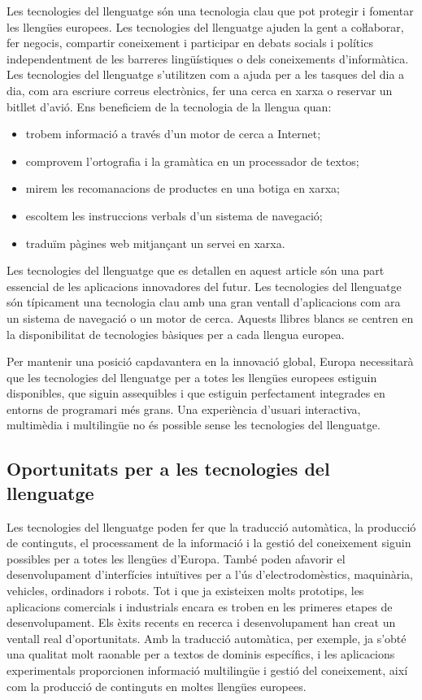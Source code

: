 \begin{multicols}{2}
Les tecnologies del llenguatge són una tecnologia clau que pot protegir i fomentar les llengües europees. Les tecnologies del llenguatge ajuden la gent a coŀlaborar, fer negocis, compartir coneixement i participar en debats socials i polítics independentment de les barreres lingüístiques o dels coneixements d’informàtica. Les tecnologies del llenguatge s’utilitzen com a ajuda per a les tasques del dia a dia, com ara escriure correus electrònics, fer una cerca en xarxa o reservar un bitllet d’avió. Ens beneficiem de la tecnologia de la llengua quan:   
\begin{itemize}
\item trobem informació a través d’un motor de cerca a Internet;
\item comprovem l’ortografia i la gramàtica en un processador de textos;
\item mirem les recomanacions de productes en una botiga en xarxa;
\item escoltem les instruccions verbals d'un sistema de navegació;
\item traduïm pàgines web mitjançant un servei en xarxa.
\end{itemize}

Les tecnologies del llenguatge que es detallen en aquest article són una part essencial de les aplicacions innovadores del futur. Les tecnologies del llenguatge són típicament una tecnologia clau amb una gran ventall d’aplicacions com ara un sistema de navegació o un motor de cerca. Aquests llibres blancs se centren en la disponibilitat de tecnologies bàsiques per a cada llengua europea.

Per mantenir una posició capdavantera en la innovació global, Europa necessitarà que les tecnologies del llenguatge per a totes les llengües europees estiguin disponibles, que siguin assequibles i que estiguin perfectament integrades en entorns de programari més grans.  Una experiència d’usuari interactiva, multimèdia i multilingüe no és possible sense les tecnologies del llenguatge.

\subsection{Oportunitats per a les tecnologies del llenguatge}

Les tecnologies del llenguatge poden fer que la traducció automàtica, la producció de continguts, el processament de la informació i la gestió del coneixement siguin possibles per a totes les llengües d’Europa. També poden afavorir el desenvolupament d’interfícies intuïtives  per a l'ús d'electrodomèstics, maquinària, vehicles, ordinadors i robots. Tot i que ja existeixen molts prototips, les aplicacions comercials i industrials encara es troben en les primeres etapes de desenvolupament. Els èxits recents en recerca i desenvolupament han creat un ventall real d’oportunitats. Amb la traducció automàtica, per exemple, ja s’obté una qualitat molt raonable per a textos de dominis específics, i les aplicacions experimentals proporcionen informació multilingüe i gestió del coneixement, així com la producció de continguts en moltes llengües europees.


\end{multicols}
